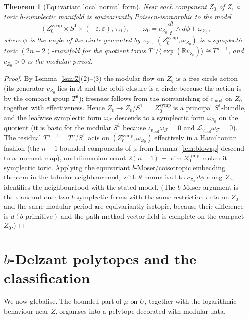 \documentclass{amsart}
\newtheorem{theorem}{Theorem}
\theoremstyle{definition}
\begin{document}
\begin{theorem}[Equivariant local normal form]\label{thm:localmodel}
Near each component $Z_0$ of $Z$, a toric $b$-symplectic manifold is
equivariantly Poisson-isomorphic to the model
\[
\bigl(\,Z_0^{\mathrm{symp}}\times S^1\times(-\varepsilon,\varepsilon),\ \pi_0\,\bigr),
\qquad
\omega_0=c_{Z_0}\frac{dt}{t}\wedge d\phi+\omega_{Z_0},
\]
where $\phi$ is the angle of the circle generated by $v_{Z_0}$,
$(Z_0^{\mathrm{symp}},\omega_{Z_0})$ is a symplectic toric
$(2n-2)$-manifold for the quotient torus $T^n/\langle\exp(\mathbb R v_{Z_0})\rangle
\cong T^{n-1}$, and $c_{Z_0}>0$ is the modular period.
\end{theorem}

\begin{proof}
By Lemma~\ref{lem:Z}(2)--(3) the modular flow on $Z_0$ is a free circle action
(its generator $v_{Z_0}$ lies in $\Lambda$ and the orbit closure is a circle
because the action is by the compact group $T^n$); freeness follows from the
nonvanishing of $v_{\mathrm{mod}}$ on $Z_0$ together with effectiveness. Hence
$Z_0\to Z_0/S^1=:Z_0^{\mathrm{symp}}$ is a principal $S^1$-bundle, and the
leafwise symplectic form $\omega_{\mathcal F}$ descends to a symplectic form
$\omega_{Z_0}$ on the quotient (it is basic for the modular $S^1$ because
$\iota_{v_{\mathrm{mod}}}\omega_{\mathcal F}=0$ and $\mathcal L_{v_{\mathrm
{mod}}}\omega_{\mathcal F}=0$). The residual $T^{n-1}=T^n/S^1$ acts on
$(Z_0^{\mathrm{symp}},\omega_{Z_0})$ effectively in a Hamiltonian fashion (the
$n-1$ bounded components of $\mu$ from Lemma~\ref{lem:blowup} descend to a
moment map), and dimension count $2(n-1)=\dim Z_0^{\mathrm{symp}}$ makes it
symplectic toric. Applying the equivariant $b$-Moser/coisotropic embedding
theorem in the tubular neighbourhood, with $\theta$ normalised to
$c_{Z_0}\,d\phi$ along $Z_0$, identifies the neighbourhood with the stated
model. (The $b$-Moser argument is the standard one: two $b$-symplectic forms
with the same restriction data on $Z_0$ and the same modular period are
equivariantly isotopic, because their difference is $d(\text{$b$-primitive})$
and the path-method vector field is complete on the compact $Z_0$.)
\end{proof}

\section{$b$-Delzant polytopes and the classification}

We now globalise. The bounded part of $\mu$ on $U$, together with the
logarithmic behaviour near $Z$, organises into a polytope decorated with
modular data.
\end{document}
